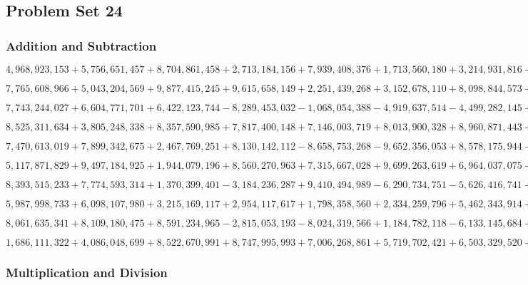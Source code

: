\hypertarget{problem-set-24-6}{%
\subsection{Problem Set 24}\label{problem-set-24-6}}

\hypertarget{addition-and-subtraction-404}{%
\subsubsection{Addition and
Subtraction}\label{addition-and-subtraction-404}}

\(4,968,923,153+5,756,651,457+8,704,861,458+2,713,184,156+7,939,408,376+1,713,560,180+3,214,931,816+2,965,675,553+5,034,248,508+7,069,584,375\)

\(7,765,608,966+5,043,204,569+9,877,415,245+9,615,658,149+2,251,439,268+3,152,678,110+8,098,844,573+8,826,133,855+8,764,705,996+8,518,715,650\)

\(7,743,244,027+6,604,771,701+6,422,123,744-8,289,453,032-1,068,054,388-4,919,637,514-4,499,282,145+6,081,035,238+5,947,286,067+9,183,175,511\)

\(8,525,311,634+3,805,248,338+8,357,590,985+7,817,400,148+7,146,003,719+8,013,900,328+8,960,871,443+4,982,904,213+1,725,778,746+2,456,534,053\)

\(7,470,613,019+7,899,342,675+2,467,769,251+8,130,142,112-8,658,753,268-9,652,356,053+8,578,175,944-3,752,172,647+5,373,362,348-4,273,000,897\)

\(5,117,871,829+9,497,184,925+1,944,079,196+8,560,270,963+7,315,667,028+9,699,263,619+6,964,037,075+9,334,396,981+3,042,689,437+3,893,872,421\)

\(8,393,515,233+7,774,593,314+1,370,399,401-3,184,236,287+9,410,494,989-6,290,734,751-5,626,416,741+1,606,145,821-7,186,249,377+6,287,739,240\)

\(5,987,998,733+6,098,107,980+3,215,169,117+2,954,117,617+1,798,358,560+2,334,259,796+5,462,343,914+6,714,788,746+2,334,775,095+4,205,297,898\)

\(8,061,635,341+8,109,180,475+8,591,234,965-2,815,053,193-8,024,319,566+1,184,782,118-6,133,145,684+1,129,644,856+9,711,593,314-1,593,101,566\)

\(1,686,111,322+4,086,048,699+8,522,670,991+8,747,995,993+7,006,268,861+5,719,702,421+6,503,329,520+7,108,187,525+3,986,541,106+2,158,454,223\)

\hypertarget{multiplication-and-division-402}{%
\subsubsection{Multiplication and
Division}\label{multiplication-and-division-402}}

